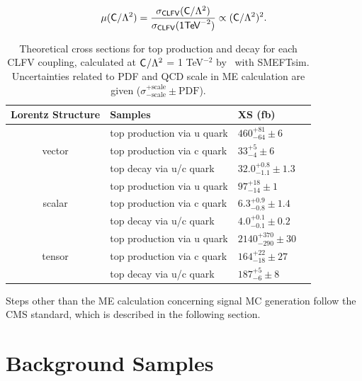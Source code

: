 \begin{equation}
\mu(\textsf{C}/\mathrm{\Lambda}^2)=\frac{\sigma_{\textsf{CLFV}}(\textsf{C}/\mathrm{\Lambda}^2)}{\sigma_{\textsf{CLFV}}(\textsf{1}\textsf{TeV}^{-2})}\propto(\textsf{C}/\mathrm{\Lambda}^2)^2.
\label{eq:signal_strength}
\end{equation}

\begin{table}[th]
\sffamily
\centering
\caption{Theoretical cross sections for top production and decay for each \ac{CLFV} coupling, calculated at $\textsf{C}^{}_{}/\mathrm{\Lambda}^2$ = 1 TeV$^{-2}$ by \MG~with SMEFTsim. Uncertainties related to \ac{PDF} and \ac{QCD} scale in \ac{ME} calculation are given ($\sigma^{+\text{scale}}_{-\text{scale}}\pm \text{PDF}$).}
\begin{tabular}{clll}
\toprule 
Lorentz Structure & Samples    & XS (fb) \\ \midrule
\multirow{3}{*}{vector} & top production via u quark & $460^{+81}_{-64}\pm6$ \\ 
  & top production via c quark & $33^{+5}_{-4}\pm6$ \\
  & top decay via u/c quark  & $32.0^{+0.8}_{-1.1}\pm1.3$ \\ \midrule
\multirow{3}{*}{scalar} &top production via u quark & $97^{+18}_{-14}\pm1$ \\ 
  & top production via c quark  & $6.3^{+0.9}_{-0.8}\pm1.4$ \\
  & top decay via u/c quark & $4.0^{+0.1}_{-0.1}\pm0.2$ \\ \midrule 
\multirow{3}{*}{tensor} & top production via u quark & $2140^{+370}_{-290}\pm30$ \\
  & top production via c quark & $164^{+22}_{-18}\pm27$ \\
  & top decay via u/c quark  & $187^{+5}_{-6}\pm8$ \\ \bottomrule
\end{tabular}
\vspace{-0.5em}
\label{tab:signal}
\end{table}

Steps other than the \ac{ME} calculation concerning signal \ac{MC} generation follow the \ac{CMS} standard, which is described in the following section.
\section{Background Samples}
\label{sec:Backgrounds}

